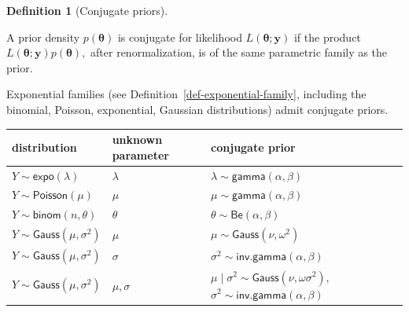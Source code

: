\documentclass[
  11pt,
  letterpaper,
]{scrbook}
\newcounter{none} %
\theoremstyle{definition}
\theoremstyle{plain}
\theoremstyle{plain}
\theoremstyle{plain}
\theoremstyle{definition}
\theoremstyle{definition}
\newtheorem{definition}{Definition}[chapter]
\theoremstyle{plain}
\theoremstyle{plain}
\theoremstyle{remark}
\begin{document}
\begin{definition}[Conjugate
priors]\protect\hypertarget{def-conjugate-prior}{}\label{def-conjugate-prior}

A prior density \(p(\boldsymbol{\theta})\) is conjugate for likelihood
\(L(\boldsymbol{\theta}; \boldsymbol{y})\) if the product
\(L(\boldsymbol{\theta}; \boldsymbol{y})p(\boldsymbol{\theta}),\) after
renormalization, is of the same parametric family as the prior.

Exponential families (see Definition~\ref{def-exponential-family},
including the binomial, Poisson, exponential, Gaussian distributions)
admit conjugate priors.

{\def\LTcaptype{none} %
\begin{longtable}[]{@{}
  >{\raggedright\arraybackslash}p{}
  >{\raggedright\arraybackslash}p{}
  >{\raggedright\arraybackslash}p{}@{}}
\toprule\noalign{}
\begin{minipage}[b]{\linewidth}\raggedright
distribution
\end{minipage} & \begin{minipage}[b]{\linewidth}\raggedright
unknown parameter
\end{minipage} & \begin{minipage}[b]{\linewidth}\raggedright
conjugate prior
\end{minipage} \\
\midrule\noalign{}
\endhead
\bottomrule\noalign{}
\endlastfoot
\(Y \sim \mathsf{expo}(\lambda)\) & \(\lambda\) &
\(\lambda \sim \mathsf{gamma}(\alpha, \beta)\) \\
\(Y \sim \mathsf{Poisson}(\mu)\) & \(\mu\) &
\(\mu \sim \mathsf{gamma}(\alpha, \beta)\) \\
\(Y \sim \mathsf{binom}(n, \theta)\) & \(\theta\) &
\(\theta \sim \mathsf{Be}(\alpha, \beta)\) \\
\(Y \sim \mathsf{Gauss}(\mu, \sigma^2)\) & \(\mu\) &
\(\mu \sim \mathsf{Gauss}(\nu, \omega^2)\) \\
\(Y \sim \mathsf{Gauss}(\mu, \sigma^2)\) & \(\sigma\) &
\(\sigma^{2} \sim \mathsf{inv. gamma}(\alpha, \beta)\) \\
\(Y \sim \mathsf{Gauss}(\mu, \sigma^2)\) & \(\mu, \sigma\) &
\(\mu \mid \sigma^2 \sim \mathsf{Gauss}(\nu, \omega \sigma^2),\)
\(\sigma^{2} \sim \mathsf{inv. gamma}(\alpha, \beta)\) \\
\end{longtable}
}

\end{definition}
\end{document}
